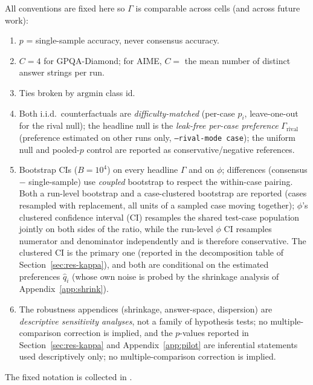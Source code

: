 \documentclass{article}
\newcommand{\agreementIndex}{\Gamma}
\begin{document}
All conventions are fixed here so $\agreementIndex$ is comparable across cells
(and across future work):
\begin{enumerate}
\item $p$ = single-sample accuracy, never consensus accuracy.
\item $C=4$ for GPQA-Diamond; for AIME, $C=$ the mean number of distinct answer strings per run.
\item Ties broken by $\mathrm{argmin}$ class id.
\item Both i.i.d.\ counterfactuals are \emph{difficulty-matched}
  (per-case $p_i$, leave-one-out for the rival null); the headline null
  is the \emph{leak-free per-case
  preference} $\agreementIndex_{\mathrm{rival}}$ (preference estimated on other runs
  only, \texttt{--rival-mode case}); the uniform null and pooled-$p$
  control are reported as conservative/negative references.
\item Bootstrap CIs ($B=10^4$) on every headline $\agreementIndex$ and on
  $\phi$; differences (consensus $-$ single-sample) use \emph{coupled}
  bootstrap to respect the within-case pairing. Both a run-level bootstrap and a case-clustered bootstrap are reported (cases
  resampled with replacement, all units of a sampled case moving
  together); $\phi$'s clustered confidence interval (CI) resamples the shared test-case
  population jointly on both sides of the ratio, while the run-level
  $\phi$ CI resamples numerator and denominator independently and is
  therefore conservative. The clustered CI is the
  primary one (reported in the decomposition table of
  Section~\ref{sec:res-kappa}), and both are conditional on the
  estimated preferences $\hat q_i$ (whose own noise is probed by the
  shrinkage analysis of Appendix~\ref{app:shrink}).
\item The robustness appendices (shrinkage, answer-space, dispersion)
  are \emph{descriptive sensitivity analyses}, not a family of
  hypothesis tests; no multiple-comparison correction is implied, and
  the $p$-values reported in Section~\ref{sec:res-kappa} and
  Appendix~\ref{app:pilot} are inferential statements used
  descriptively only; no multiple-comparison correction is implied.
\end{enumerate}
The fixed notation is collected in .
\end{document}
